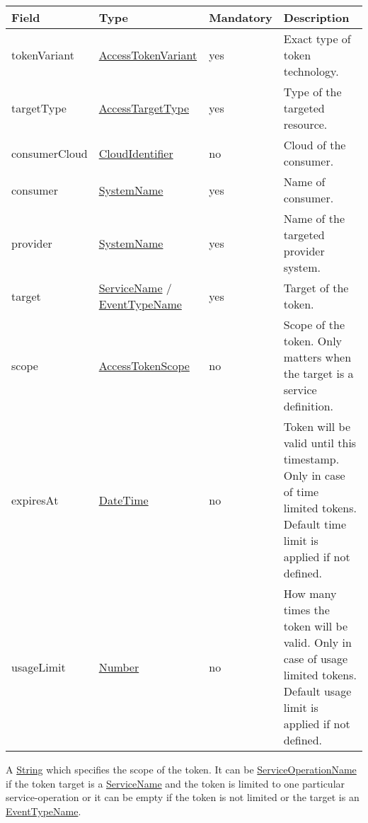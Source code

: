 \documentclass[a4paper]{arrowhead}
\newcommand{\pref}[1]{{\textcolor{ArrowheadGrey}{\hyperref[sec:model:primitives:#1]{#1}}}}
\begin{document}
\begin{table}[ht!]
\begin{tabularx}{\textwidth}{| p{3cm} | p{4.5cm} | p{2cm} | X |} \hline
\rowcolor{gray!33} Field & Type & Mandatory & Description \\ \hline
tokenVariant & \pref{AccessTokenVariant} & yes & Exact type of token technology. \\ \hline
targetType & \pref{AccessTargetType} & yes & Type of the targeted resource. \\ \hline
consumerCloud & \pref{CloudIdentifier} & no & Cloud of the consumer. \\ \hline
consumer & \pref{SystemName} & yes & Name of consumer. \\ \hline
provider & \pref{SystemName} & yes & Name of the targeted provider system. \\ \hline
target & \pref{ServiceName} / \pref{EventTypeName} & yes & Target of the token. \\ \hline
scope & \hyperref[sec:model:AccessTokenScope]{AccessTokenScope} & no & Scope of the token. Only matters when the target is a service definition. \\ \hline
expiresAt & \pref{DateTime} & no & Token will be valid until this timestamp. Only in case of time limited tokens. Default time limit is applied if not defined. \\ \hline
usageLimit & \pref{Number} & no & How many times the token will be valid. Only in case of usage limited tokens. Default usage limit is applied if not defined. \\ \hline
\end{tabularx}
\end{table}


A \pref{String} which specifies the scope of the token. It can be \pref{ServiceOperationName} if the token target is a \pref{ServiceName} and the token is limited to one particular service-operation or it can be empty if the token is not limited or the target is an \pref{EventTypeName}. 

\end{document}
